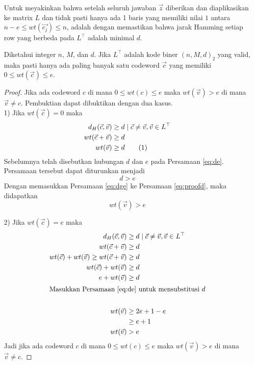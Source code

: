 Untuk meyakinkan bahwa setelah seluruh jawaban $\vec{z}$ diberikan dan diaplikasikan ke matrix $L$ dan tidak pasti hanya ada 1 baris yang memiliki nilai $1$ antara $n-e \le wt(\vec{c_j}) \le n$, adalah dengan memastikan bahwa jarak Hamming setiap row yang berbeda pada $L^\top$ adalah minimal $d$.

\begin{lemma}
Diketahui integer $n$, $M$, dan $d$. Jika $L^\top$ adalah kode biner $(n,M,d)_2$ yang valid, maka pasti hanya ada paling banyak satu codeword $\vec{c}$ yang memiliki $0 \le wt(\vec{c}) \le e$.
\end{lemma}

\begin{proof}
Jika ada codeword $c$ di mana $0 \le wt(c) \le e$ maka $wt(\vec{v}) > e$ di mana $\vec{v} \neq c$. Pembuktian dapat dibuktikan dengan dua kasus.\\

1) Jika $wt(\vec{c}) = 0$ maka
\begin{align*}
d_H(\vec{c},\vec{v}) &\ge d \mid \vec{c} \neq \vec{v} , \vec{v} \in L^\top \\
wt(\vec{c} + \vec{v}) &\ge d \\
wt(\vec{v}) &\ge d \label{eq:proofd} \stepcounter{equation} \tag{\theequation}
\end{align*}
Sebelumnya telah disebutkan hubungan $d$ dan $e$ pada Persamaan \ref{eq:de}. Persamaan tersebut dapat diturunkan menjadi
\begin{equation} \label{eq:dge}
d > e
\end{equation}
Dengan memasukkan Persamaan \ref{eq:dge} ke Persamaan \ref{eq:proofd}, maka didapatkan
\begin{equation*}
wt(\vec{v}) > e
\end{equation*}

2) Jika $wt(\vec{c}) = e$ maka
\begin{align*}
d_H(\vec{c},\vec{v}) &\ge d \mid \vec{c} \neq \vec{v} , \vec{v} \in L^\top \\
wt(\vec{c}+\vec{v}) &\ge d \\
wt(\vec{c}) + wt(\vec{v}) \ge wt(\vec{c}+\vec{v}) &\ge d \\
wt(\vec{c}) + wt(\vec{v}) &\ge d \\
e + wt(\vec{v}) &\ge d \\
\intertext{Masukkan Persamaan \ref{eq:de} untuk mensubstitusi $d$}\\
wt(\vec{v}) &\ge 2e+1-e \\
&\ge e+1\\
wt(\vec{v}) &> e
\end{align*}
Jadi jika ada codeword $c$ di mana $0 \le wt(c) \le e$ maka $wt(\vec{v}) > e$ di mana $\vec{v} \neq c$.
\end{proof}


